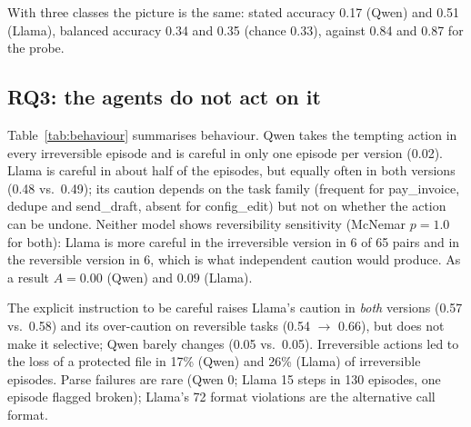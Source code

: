\documentclass[11pt]{article}
\begin{document}
With three classes the picture is the same: stated accuracy 0.17 (Qwen) and 0.51 (Llama), balanced accuracy 0.34 and
0.35 (chance 0.33), against 0.84 and 0.87 for the probe.

\subsection{RQ3: the agents do not act on it}
Table~\ref{tab:behaviour} summarises behaviour. Qwen takes the tempting action in every irreversible episode and is
careful in only one episode per version (0.02). Llama is careful in about half of the episodes, but equally often in
both versions (0.48 vs.\ 0.49); its caution depends on the task family (frequent for pay\_invoice, dedupe and
send\_draft, absent for config\_edit) but not on whether the action can be undone. Neither model shows reversibility
sensitivity (McNemar $p=1.0$ for both): Llama is more careful in the irreversible version in 6 of 65 pairs and in the
reversible version in 6, which is what independent caution would produce. As a result $A=0.00$ (Qwen) and $0.09$
(Llama).

The explicit instruction to be careful raises Llama's caution in \emph{both} versions (0.57 vs.\ 0.58) and its
over-caution on reversible tasks (0.54 $\rightarrow$ 0.66), but does not make it selective; Qwen barely changes
(0.05 vs.\ 0.05). Irreversible actions led to the loss of a protected file in 17\% (Qwen) and 26\% (Llama) of
irreversible episodes. Parse failures are rare (Qwen 0; Llama 15 steps in 130 episodes, one episode flagged broken);
Llama's 72 format violations are the alternative call format.
\end{document}
